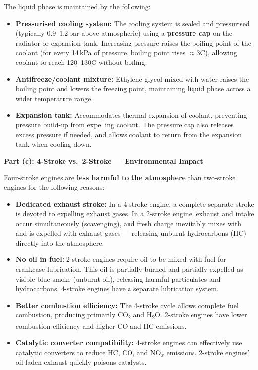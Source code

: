 \documentclass[12pt,a3paper]{article}
\begin{document}
\begin{enumerate}
\begin{tcolorbox}[enhanced,breakable,ansbox,colback=cB!4,colframe=cB,
  boxrule=0.8pt,arc=5pt,
  title={\textbf{Answer}},fonttitle=\bfseries\color{white},colbacktitle=cB]
The liquid phase is maintained by the following:
\begin{itemize}[leftmargin=1.5em,itemsep=2pt]
  \item \textbf{Pressurised cooling system:} The cooling system is sealed and
        pressurised (typically 0.9--1.2\,bar above atmospheric) using a
        \textbf{pressure cap} on the radiator or expansion tank. Increasing
        pressure raises the boiling point of the coolant (for every 14\,kPa of
        pressure, boiling point rises $\approx$3\textdegree C), allowing coolant
        to reach 120--130\textdegree C without boiling.
  \item \textbf{Antifreeze/coolant mixture:} Ethylene glycol mixed with water
        raises the boiling point and lowers the freezing point, maintaining
        liquid phase across a wider temperature range.
  \item \textbf{Expansion tank:} Accommodates thermal expansion of coolant,
        preventing pressure build-up from expelling coolant. The pressure cap
        also releases excess pressure if needed, and allows coolant to return
        from the expansion tank when cooling down.
\end{itemize}

\hrulefill

\textbf{Part (c): 4-Stroke vs.\ 2-Stroke — Environmental Impact}

Four-stroke engines are \textbf{less harmful to the atmosphere} than two-stroke
engines for the following reasons:

\begin{itemize}[leftmargin=1.5em,itemsep=3pt]
  \item \textbf{Dedicated exhaust stroke:} In a 4-stroke engine, a complete
        separate stroke is devoted to expelling exhaust gases. In a 2-stroke
        engine, exhaust and intake occur simultaneously (scavenging), and fresh
        charge inevitably mixes with and is expelled with exhaust gases —
        releasing unburnt hydrocarbons (HC) directly into the atmosphere.
  \item \textbf{No oil in fuel:} 2-stroke engines require oil to be mixed with
        fuel for crankcase lubrication. This oil is partially burned and
        partially expelled as visible blue smoke (unburnt oil), releasing harmful
        particulates and hydrocarbons. 4-stroke engines have a separate
        lubrication system.
  \item \textbf{Better combustion efficiency:} The 4-stroke cycle allows
        complete fuel combustion, producing primarily CO\textsubscript{2} and
        H\textsubscript{2}O. 2-stroke engines have lower combustion efficiency
        and higher CO and HC emissions.
  \item \textbf{Catalytic converter compatibility:} 4-stroke engines can
        effectively use catalytic converters to reduce HC, CO, and NO$_x$
        emissions. 2-stroke engines' oil-laden exhaust quickly poisons catalysts.
\end{itemize}


\end{tcolorbox}
\end{enumerate}
\end{document}

